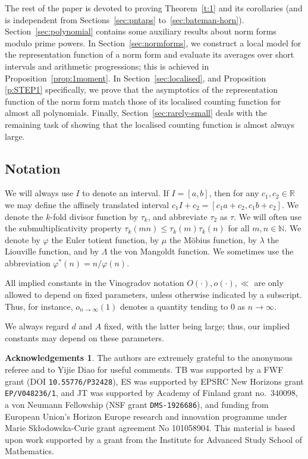 \documentclass[11pt,letterpaper]{amsart}
\renewcommand{\leq}{\leqslant}
\theoremstyle{definition}
\numberwithin{equation}{section}
\newtheorem*{ack}{Acknowledgements}
\newcommand{\0}{\mathbf{0}}
\begin{document}
The rest of the paper is devoted to proving Theorem~\ref{t:1} and its corollaries (and is independent from Sections~\ref{sec:pntaps} to~\ref{sec:bateman-horn}). Section~\ref{sec:polynomial} contains some auxiliary results about norm forms modulo prime powers. In Section~\ref{sec:normforms}, we construct a local model for the representation function of a norm form and evaluate its averages over short intervals and arithmetic progressions; this is achieved in Proposition~\ref{prop:1moment}. In Section~\ref{sec:localised}, and Proposition \ref{p:STEP1} specifically, we prove that the asymptotics of the representation function of the norm form match those of its localised counting function for almost all polynomials. Finally, Section~\ref{sec:rarely-small} deals with the remaining task of showing that the localised counting function is almost always large. 


\subsection*{Notation}
We will always use 
$I$ to denote an interval. If $I=[a,b]$, then for any $c_1,c_2\in \mathbb{R}$ we may define the affinely translated interval $c_1I+c_2=[c_1a+c_2,c_1b+c_2]$.
We denote the $k$-fold divisor function by $\tau_k$, and abbreviate $\tau_2$ as $\tau$. We will often use the submultiplicativity property $\tau_k(mn)\leq \tau_k(m)\tau_k(n)$ for all $m,n\in \mathbb{N}$. We denote by $\varphi$ the Euler 
totient 
function, by $\mu$ the M\"obius function, by $\lambda$ the Liouville function, and by $\Lambda$ the von Mangoldt function. We sometimes use the abbreviation $\varphi^{*}(n)=n/\varphi(n)$.

All implied constants in the Vinogradov notation $O(\cdot),o(\cdot),\ll$ are  only allowed to depend on fixed parameters, unless otherwise indicated by  a subscript. Thus, for instance, $o_{n\to \infty}(1)$ denotes a quantity tending to $0$ as $n\to \infty$.

We always regard $d$ and $A$ fixed, with the latter being large; thus, our implied constants may depend on these parameters. 

\begin{ack} 
The authors are extremely grateful to the anonymous referee 
and to Yijie Diao for useful comments. 
TB was supported
by a FWF grant (DOI \texttt{10.55776/P32428}),
ES was supported by EPSRC
 New Horizons  
grant \texttt{EP/V048236/1}, 
 and JT was supported by Academy of Finland grant no.\ 340098, a von Neumann Fellowship (NSF grant \texttt{DMS-1926686}), and funding from European Union's Horizon
Europe research and innovation programme under Marie Sk\l{}odowska-Curie grant agreement No
101058904.
 This material is based upon work supported by a grant from the Institute
for Advanced Study School of Mathematics. 
\end{ack}
\end{document}
